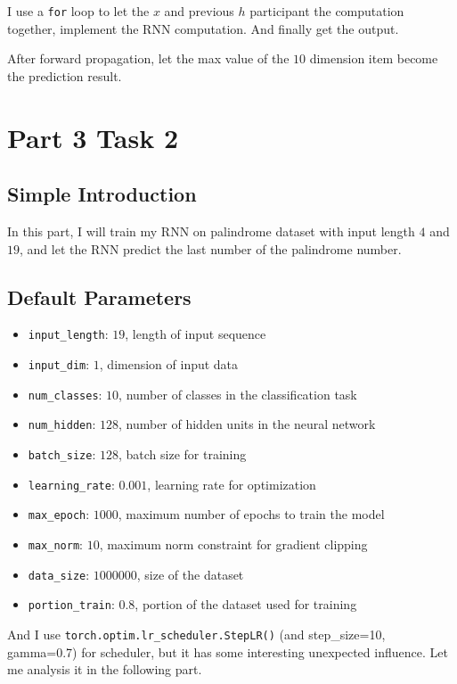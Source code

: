 \documentclass{article}
\begin{document}
I use a \texttt{for} loop to let the $x$ and previous $h$ participant the computation together, implement the RNN computation. And finally get the output.

After forward propagation, let the max value of the $10$ dimension item become the prediction result. 

\section{Part 3 Task 2}

\subsection{Simple Introduction}

In this part, I will train my RNN on palindrome dataset with input length $4$ and $19$, and let the RNN predict the last number of the palindrome number.

\subsection{Default Parameters}


\begin{itemize}
    \item \texttt{input\_length}: $19$, length of input sequence
    \item \texttt{input\_dim}: $1$, dimension of input data
    \item \texttt{num\_classes}: $10$, number of classes in the classification task
    \item \texttt{num\_hidden}: $128$, number of hidden units in the neural network
    \item \texttt{batch\_size}: $128$, batch size for training
    \item \texttt{learning\_rate}: $0.001$, learning rate for optimization
    \item \texttt{max\_epoch}: $1000$, maximum number of epochs to train the model
    \item \texttt{max\_norm}: $10$, maximum norm constraint for gradient clipping
    \item \texttt{data\_size}: $1000000$, size of the dataset
    \item \texttt{portion\_train}: $0.8$, portion of the dataset used for training
\end{itemize}

And I use \texttt{torch.optim.lr\_scheduler.StepLR()} (and step\_size=10, gamma=0.7) for scheduler,  but it has some interesting unexpected influence. Let me analysis it in the following part.
\end{document}
